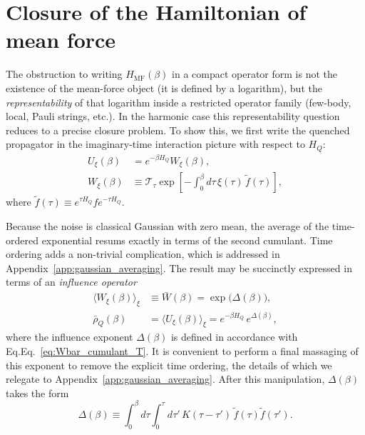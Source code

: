 \section{Closure of the Hamiltonian of mean force \label{sec:closure}}
The obstruction to writing $H_{\mathrm{MF}}(\beta)$ in a compact operator form is not the
existence of the mean-force object (it is defined by a logarithm), but the \emph{representability} of that logarithm inside a restricted operator family (few-body, local, Pauli strings, etc.). In the harmonic case this representability question reduces to a precise closure problem. To show this, we first write the quenched propagator in the imaginary-time interaction picture with respect to $H_Q$:
\begin{equation}
    \begin{split}
        U_\xi(\beta) & = e^{-\beta H_Q} W_\xi(\beta),                                                             \\
        W_\xi(\beta) & \equiv \mathcal T_\tau \exp\!\left[-\int_0^\beta d\tau\, \xi(\tau)\,\tilde f(\tau)\right],
    \end{split}
    \label{eq:Wxi_def}
\end{equation}
where $\tilde f(\tau)\equiv e^{\tau H_Q} f e^{-\tau H_Q}$.

Because the noise is classical Gaussian with zero mean, the average of the
time-ordered exponential resums exactly in terms of the second cumulant. Time ordering adds a non-trivial complication, which is addressed in Appendix~\ref{app:gaussian_averaging}. The result may be succinctly expressed in terms of an \emph{influence operator}
\begin{equation}
    \begin{split}
          \langle W_\xi(\beta)\rangle_\xi &\equiv \bar W(\beta) = \exp\!\big(\Delta(\beta)\big), \\
        \bar\rho_Q(\beta) &= \langle U_\xi(\beta)\rangle_\xi = e^{-\beta H_Q}\,e^{\Delta(\beta)},
    \end{split}
    \label{eq:rho_bar_product_form}
\end{equation}
where the influence exponent $\Delta(\beta)$ is defined in accordance with Eq.Eq.~\eqref{eq:Wbar_cumulant_T}. 
It is convenient to perform a final massaging of this exponent to remove the explicit time ordering, the details of which we relegate to Appendix~\ref{app:gaussian_averaging}. After this manipulation, $\Delta(\beta)$ takes the form
\begin{equation}
\Delta(\beta)\equiv \int_0^\beta d\tau\int_0^\tau d\tau'\,
K(\tau-\tau')\,\tilde f(\tau)\tilde f(\tau').
\label{eq:Delta_def_hermitian}
\end{equation}

